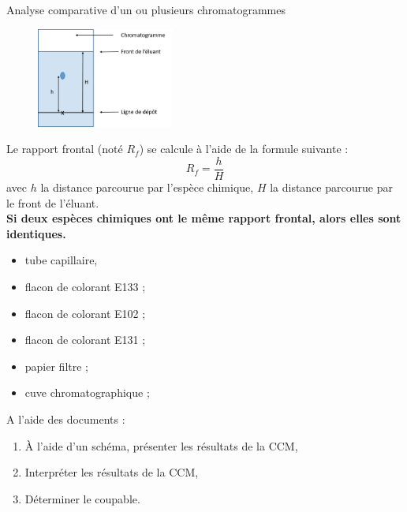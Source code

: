 \begin{doc}{Analyse comparative d'un ou plusieurs chromatogrammes}
\begin{figure}
\vspace{-1cm}
    \centering
      \includegraphics[width=0.4\textwidth]{Images/TP2/Chromatogramme.png}
  \end{figure}
    Le rapport frontal (noté $R_f$) se calcule à l'aide de la formule suivante :
\begin{equation*}
    R_f = \frac{h}{H}
\end{equation*}
avec $h$ la distance parcourue par l'espèce chimique, $H$ la distance parcourue par le front de l'éluant.\\
\textbf{Si deux espèces chimiques ont le même rapport frontal, alors elles sont identiques.}

\end{doc}



\begin{mdframed}[style=autreexo]
\textbf{}
\begin{itemize}
    \item tube capillaire,
    \item flacon de colorant E133 ;
    \item flacon de colorant E102 ;
    \item flacon de colorant E131 ;
    \item papier filtre ;
    \item cuve chromatographique ;
\end{itemize}
\end{mdframed}
A l’aide des documents :
\begin{enumerate}
    \item À l’aide d’un schéma, présenter les résultats de la CCM,
    \item Interpréter les résultats de la CCM,
    \item Déterminer le coupable.
\end{enumerate}
